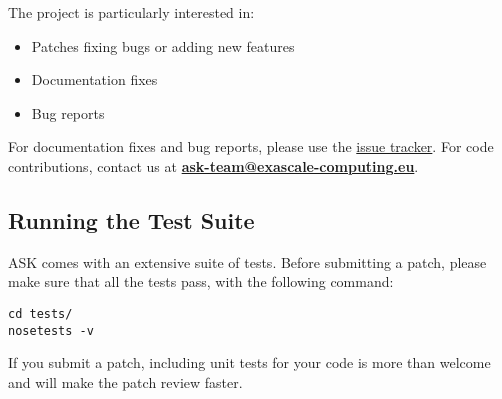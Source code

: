 The project is particularly interested in:
\begin{itemize}
	\item Patches fixing bugs or adding new features
	\item Documentation fixes
	\item Bug reports
\end{itemize}

For documentation fixes and bug reports, please use the \href{http://code.google.com/p/adaptive-sampling-kit/issues/list}{issue tracker}.
For code contributions, contact us at \textbf{\href{mailto:ask-team@exascale-computing.eu}{ask-team@exascale-computing.eu}}.

\subsection{Running the Test Suite}

ASK comes with an extensive suite of tests. Before submitting a patch, please make sure that all the tests pass, with the following command:
\begin{verbatim}
cd tests/
nosetests -v
\end{verbatim}

If you submit a patch, including unit tests for your code is more than welcome and will make the patch review faster.
